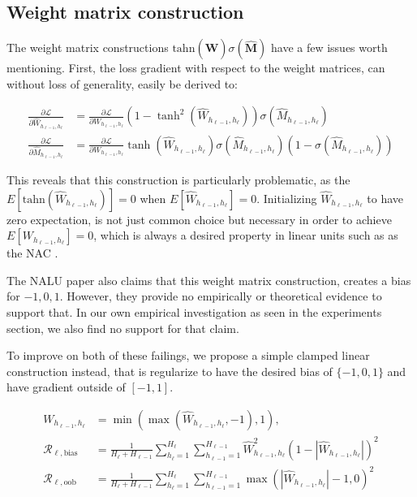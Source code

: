 \subsection{Weight matrix construction}

The weight matrix constructions $\mathrm{tahn}({\hat{\mathbf{W}}}) \sigma({\hat{\mathbf{M}}})$ have a few issues worth mentioning. First, the loss gradient with respect to the weight matrices, can without loss of generality, easily be derived to:

\begin{equation}
\begin{aligned}
\frac{\partial \mathcal{L}}{\partial \hat{W}_{h_{\ell-1},h_\ell}} &= \frac{\partial \mathcal{L}}{\partial W_{h_{\ell-1},h_\ell}} (1 - \tanh^2(\hat{W}_{h_{\ell-1},h_\ell})) \sigma(\hat{M}_{h_{\ell-1},h_\ell}) \\
\frac{\partial \mathcal{L}}{\partial \hat{M}_{h_{\ell-1},h_\ell}} &= \frac{\partial \mathcal{L}}{\partial W_{h_{\ell-1},h_\ell}} \tanh(\hat{W}_{h_{\ell-1},h_\ell}) \sigma(\hat{M}_{h_{\ell-1},h_\ell}) (1 - \sigma(\hat{M}_{h_{\ell-1},h_\ell}))
\end{aligned}
\end{equation}

This reveals that this construction is particularly problematic, as the $E[\mathrm{tahn}(\hat{W}_{h_{\ell-1},h_\ell})] = 0$ when $E[\hat{W}_{h_{\ell-1},h_\ell}] = 0$. Initializing $\hat{W}_{h_{\ell-1},h_\ell}$ to have zero expectation, is not just common choice but necessary in order to achieve $E[W_{h_{\ell-1},h_\ell}] = 0$, which is always a desired property in linear units such as as the NAC \cite{glorot-initialization}.

The NALU \cite{trask-nalu} paper also claims that this weight matrix construction, creates a bias for ${-1, 0, 1}$. However, they provide no empirically or theoretical evidence to support that. In our own empirical investigation as seen in the experiments section, we also find no support for that claim.

To improve on both of these failings, we propose a simple clamped linear construction instead, that is regularize to have the desired bias of $\{-1, 0, 1\}$ and have gradient outside of $[-1, 1]$.

\begin{equation}
\begin{aligned}
W_{h_{\ell-1},h_\ell} &= \min(\max(\hat{W}_{h_{\ell-1},h_\ell}, -1), 1), \\
\mathcal{R}_{\ell,\mathrm{bias}} &= \frac{1}{H_\ell + H_{\ell-1}} \sum_{h_\ell=1}^{H_\ell} \sum_{h_{\ell-1}=1}^{H_{\ell-1}} \hat{W}_{h_{\ell-1},h_\ell}^2 (1 - |\hat{W}_{h_{\ell-1},h_\ell}|)^2 \\
\mathcal{R}_{\ell,\mathrm{oob}} &= \frac{1}{H_\ell + H_{\ell-1}} \sum_{h_\ell=1}^{H_\ell} \sum_{h_{\ell-1}=1}^{H_{\ell-1}} \max(|\hat{W}_{h_{\ell-1},h_\ell}| - 1, 0)^2
\end{aligned}
\end{equation}

